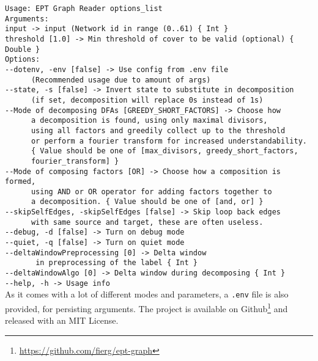\verb|Usage: EPT Graph Reader options_list|\\
\verb|Arguments: |\\
\verb|input -> input (Network id in range (0..61) { Int }|\\
\verb|threshold [1.0] -> Min threshold of cover to be valid (optional) { Double }|\\
\verb|Options: |\\
\verb|--dotenv, -env [false] -> Use config from .env file|\\
\verb|		(Recommended usage due to amount of args) |\\
\verb|--state, -s [false] -> Invert state to substitute in decomposition|\\
\verb|		(if set, decomposition will replace 0s instead of 1s) |\\
\verb|--Mode of decomposing DFAs [GREEDY_SHORT_FACTORS] -> Choose how|\\
\verb|		a decomposition is found, using only maximal divisors,|\\
\verb|		using all factors and greedily collect up to the threshold|\\
\verb|		or perform a fourier transform for increased understandability.|\\
\verb|		{ Value should be one of [max_divisors, greedy_short_factors,|\\
\verb| 		fourier_transform] }|\\
\verb|--Mode of composing factors [OR] -> Choose how a composition is formed,|\\
\verb|		using AND or OR operator for adding factors together to|\\
\verb|		a decomposition. { Value should be one of [and, or] }|\\
\verb|--skipSelfEdges, -skipSelfEdges [false] -> Skip loop back edges|\\
\verb|		with same source and target, these are often useless. |\\
\verb|--debug, -d [false] -> Turn on debug mode |\\
\verb|--quiet, -q [false] -> Turn on quiet mode |\\
\verb|--deltaWindowPreprocessing [0] -> Delta window|\\
\verb|		 in preprocessing of the label { Int }|\\
\verb|--deltaWindowAlgo [0] -> Delta window during decomposing { Int }|\\
\verb|--help, -h -> Usage info |\\

As it comes with a lot of different modes and parameters, a \verb*|.env| file is also provided, for persisting arguments.
The project is available on Github\footnote{\url{https://github.com/fierg/ept-graph}} and released with an MIT License.